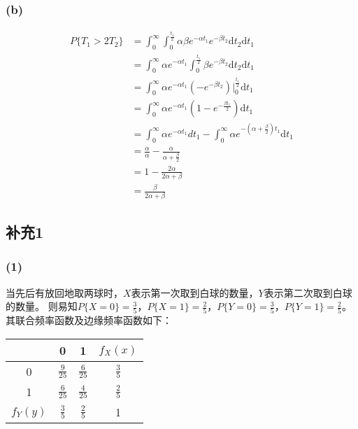 \documentclass[a4paper,12pt]{ctexart}
\begin{document}
\subsubsection*{(b)}

\begin{align*}
	P\{T_1 > 2T_2\} &= \int_{0}^{\infty}\int_{0}^{\frac{t_1}{2}}\alpha\beta e^{-\alpha t_1}e^{-\beta t_2} \mathrm{d}t_2 \mathrm{d}t_1 \\
	&= \int_{0}^{\infty}\alpha e^{-\alpha t_1}\int_{0}^{\frac{t_1}{2}}\beta e^{-\beta t_2} \mathrm{d}t_2 \mathrm{d}t_1 \\
	&= \int_{0}^{\infty}\alpha e^{-\alpha t_1}(-e^{-\beta t_2})\Big|_{0}^{\frac{t_1}{2}} \mathrm{d}t_1 \\
	&= \int_{0}^{\infty}\alpha e^{-\alpha t_1}(1-e^{-\frac{\beta t_1}{2}}) \mathrm{d}t_1 \\
	&= \int_{0}^{\infty}\alpha e^{-\alpha t_1}dt_1 - \int_{0}^{\infty}\alpha e^{-(\alpha+\frac{\beta}{2}) t_1} \mathrm{d}t_1 \\
	&= \frac{\alpha}{\alpha} - \frac{\alpha}{\alpha+\frac{\beta}{2}} \\
	&= 1 - \frac{2\alpha}{2\alpha+\beta} \\
	&= \frac{\beta}{2\alpha+\beta}
\end{align*}

\subsection*{补充1}

\subsubsection*{(1)}

当先后有放回地取两球时，$X$表示第一次取到白球的数量，$Y$表示第二次取到白球的数量。
则易知$P\{X = 0\} = \frac{3}{5}$，$P\{X = 1\} = \frac{2}{5}$，$P\{Y = 0\} = \frac{3}{5}$，$P\{Y = 1\} = \frac{2}{5}$。
其联合频率函数及边缘频率函数如下：
\begin{center}
	\begin{tabular}{c|cc|c}
		\diagbox{$X$}{$Y$} & 0 & 1 & $f_X(x)$ \\
		\hline
		0 & $\frac{9}{25}$ & $\frac{6}{25}$ & $\frac{3}{5}$ \\
		1 & $\frac{6}{25}$ & $\frac{4}{25}$ & $\frac{2}{5}$ \\
		\hline
		$f_Y(y)$ & $\frac{3}{5}$ & $\frac{2}{5}$ & 1
	\end{tabular}
\end{center}
\end{document}
